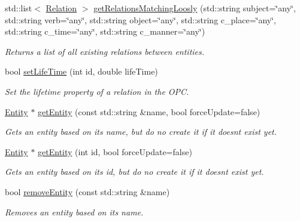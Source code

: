 \begin{DoxyCompactItemize}
std\+::list$<$ \hyperlink{group__icubclient__representations_classicubclient_1_1Relation}{Relation} $>$ \hyperlink{group__icubclient__clients_a9eb229857b2afdf17304e8bdd6fb2b61}{get\+Relations\+Matching\+Loosly} (std\+::string subject=\char`\"{}any\char`\"{}, std\+::string verb=\char`\"{}any\char`\"{}, std\+::string object=\char`\"{}any\char`\"{}, std\+::string c\+\_\+place=\char`\"{}any\char`\"{}, std\+::string c\+\_\+time=\char`\"{}any\char`\"{}, std\+::string c\+\_\+manner=\char`\"{}any\char`\"{})
\begin{DoxyCompactList}\small\item\em Returns a list of all existing relations between entities. \end{DoxyCompactList}\item 
bool \hyperlink{group__icubclient__clients_aa3df78dc97e0148fea927dd85c053fbf}{set\+Life\+Time} (int id, double life\+Time)
\begin{DoxyCompactList}\small\item\em Set the lifetime property of a relation in the O\+PC. \end{DoxyCompactList}\item 
\hyperlink{group__icubclient__representations_classicubclient_1_1Entity}{Entity} $\ast$ \hyperlink{group__icubclient__clients_ad0aea7a8df35f5e01f352b789ea043e1}{get\+Entity} (const std\+::string \&name, bool force\+Update=false)
\begin{DoxyCompactList}\small\item\em Gets an entity based on its name, but do no create it if it doesn\textquotesingle{}t exist yet. \end{DoxyCompactList}\item 
\hyperlink{group__icubclient__representations_classicubclient_1_1Entity}{Entity} $\ast$ \hyperlink{group__icubclient__clients_aa7accc436612cd9cd73fb264649675ee}{get\+Entity} (int id, bool force\+Update=false)
\begin{DoxyCompactList}\small\item\em Gets an entity based on its id, but do no create it if it doesn\textquotesingle{}t exist yet. \end{DoxyCompactList}\item 
bool \hyperlink{group__icubclient__clients_a19a6372fc0c11da66009ba4e11ac6b38}{remove\+Entity} (const std\+::string \&name)
\begin{DoxyCompactList}\small\item\em Removes an entity based on its name. \end{DoxyCompactList}\item 

\end{DoxyCompactItemize}
